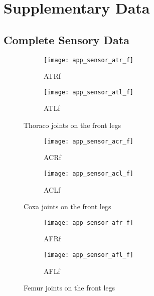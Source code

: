 \chapter{Supplementary Data} \label{app:supp_data}

\section{Complete Sensory Data} \label{sec:complete_sensory_data}

\begin{figure}[H]
\centering
\begin{subfigure}{0.48\textwidth}
  \centering
  \texttt{[image: app\_sensor\_atr\_f]}
  \caption{ATRf}
  \label{fig:app_atr_f}
\end{subfigure}
\begin{subfigure}{0.48\textwidth}
  \centering
  \texttt{[image: app\_sensor\_atl\_f]}
  \caption{ATLf}
  \label{fig:app_atl_f}
\end{subfigure}
\caption{Thoraco joints on the front legs}
\label{fig:app_at_f}
\end{figure}

\begin{figure}[H]
\centering
\begin{subfigure}{0.48\textwidth}
  \centering
  \texttt{[image: app\_sensor\_acr\_f]}
  \caption{ACRf}
  \label{fig:app_acr_f}
\end{subfigure}
\begin{subfigure}{0.48\textwidth}
  \centering
  \texttt{[image: app\_sensor\_acl\_f]}
  \caption{ACLf}
  \label{fig:app_acl_f}
\end{subfigure}
\caption{Coxa joints on the front legs}
\label{fig:app_ac_f}
\end{figure}

\begin{figure}[H]
\centering
\begin{subfigure}{0.48\textwidth}
  \centering
  \texttt{[image: app\_sensor\_afr\_f]}
  \caption{AFRf}
  \label{fig:app_afr_f}
\end{subfigure}
\begin{subfigure}{0.48\textwidth}
  \centering
  \texttt{[image: app\_sensor\_afl\_f]}
  \caption{AFLf}
  \label{fig:app_afl_f}
\end{subfigure}
\caption{Femur joints on the front legs}
\label{fig:app_af_f}
\end{figure}

